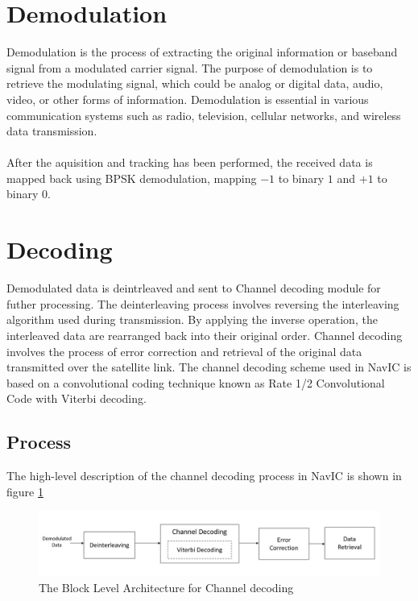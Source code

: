 \section{Demodulation}
Demodulation is the process of extracting the original information or baseband signal from a modulated carrier signal. The purpose of demodulation is to retrieve the modulating signal, which could be analog or digital data, audio, video, or other forms of information. Demodulation is essential in various communication systems such as radio, television, cellular networks, and wireless data transmission.
\\
\\
After the aquisition and tracking has been performed, the received data is mapped back using BPSK demodulation, mapping $-1$ to binary $1$ and $+1$ to binary $0$.

\section{Decoding}
Demodulated data is deintrleaved and sent to Channel decoding module for futher processing. The deinterleaving process involves reversing the interleaving algorithm used during transmission. By applying the inverse operation, the interleaved data are rearranged back into their original order. 
Channel decoding involves the process of error correction and retrieval of the original data transmitted over the satellite link. The channel decoding scheme used in NavIC is based on a convolutional coding technique known as Rate 1/2 Convolutional Code with Viterbi decoding.
\subsection{Process}
The high-level description of the channel decoding process in NavIC is shown in figure \ref{fig:decoding_r}
\begin{normalsize}
\begin{figure}[ht]
\centering
\includegraphics[width=1\columnwidth]{figs/decoding_r.jpg}
\centering
\captionsetup{justification=centering}
\caption{The Block Level Architecture for Channel decoding}
\label{fig:decoding_r}
\end{figure}
\end{normalsize}


